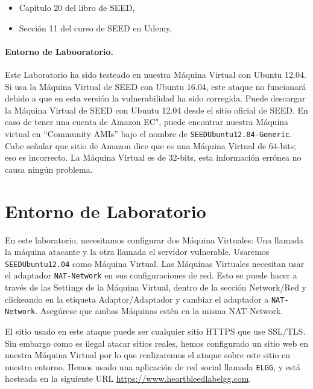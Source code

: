 \begin{itemize}
\item Capítulo 20 del libro de SEED, \seedbook
\item Sección 11 del curso de SEED en Udemy, \seedisvideo
\end{itemize}



\paragraph{Entorno de Labooratorio.} Este Laboratorio ha sido testeado en nuestra Máquina Virtual con Ubuntu 12.04. Si usa la Máquina Virtual de SEED con Ubuntu 16.04, este ataque no funcionará debido a que en esta versión la vulnerabilidad ha sido corregida.
Puede descargar la Máquina Virtual de SEED con Ubuntu 12.04 desde el sitio oficial de SEED. En caso de tener una cuenta de Amazon EC", puede encontrar nuestra Máquina virtual en ``Community AMIs'' bajo el nombre de \texttt{SEEDUbuntu12.04-Generic}. Cabe señalar que sitio de Amazon dice que es una Máquina Virtual de 64-bits; eso es incorrecto. La Máquina Virtual es de 32-bits, esta información errónea no causa ningún problema.



\section{Entorno de Laboratorio}

En este laboratorio, necesitamos configurar dos Máquina Virtuales: Una llamada la máquina atacante y la otra llamada el servidor vulnerable.
Usaremos \texttt{SEEDUbuntu12.04} como Máquina Virtual. Las Máquinas Virtuales necesitan usar el adaptador \texttt{NAT-Network} en sus configuraciones de red. Esto se puede hacer a través de las Settings de la Máquina Virtual, dentro de la sección Network/Red y clickeando en la etiqueta Adaptor/Adaptador y cambiar el adaptador a \texttt{NAT-Network}. Asegúrese que ambas Máquinas estén en la misma NAT-Network.

El sitio usado en este ataque puede ser cualquier sitio HTTPS que use SSL/TLS.
Sin embargo como es ilegal atacar sitios reales, hemos configurado un sitio web en nuestra Máquina Virtual por lo que realizaremos el ataque sobre este sitio en nuestro entorno.
Hemos usado una aplicación de red social llamada \texttt{ELGG}, y está hosteada en la siguiente URL  \url{https://www.heartbleedlabelgg.com}.

